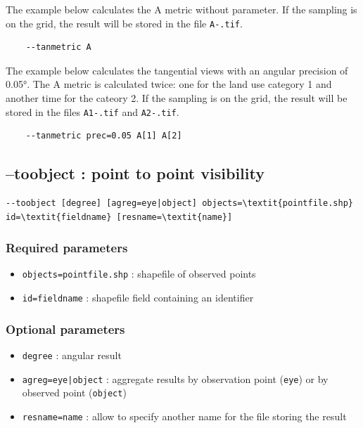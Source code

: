 \documentclass{report}
\begin{document}
The example below calculates the A metric without parameter. If the sampling is on the grid, the result will be stored in the file \verb|A-.tif|.
\begin{Verbatim}
	--tanmetric A
\end{Verbatim}

The example below calculates the tangential views with an angular precision of 0.05°. The A metric is calculated twice: one for the land use category 1 and another time for the cateory 2. If the sampling is on the grid, the result will be stored in the files \verb|A1-.tif| and \verb|A2-.tif|.
\begin{Verbatim}
	--tanmetric prec=0.05 A[1] A[2]
\end{Verbatim}

\subsection{--toobject : point to point visibility}
\begin{Verbatim}[commandchars=\\\{\}]
--toobject [degree] [agreg=eye|object] objects=\textit{pointfile.shp} id=\textit{fieldname} [resname=\textit{name}]
\end{Verbatim}

\subsubsection{Required parameters}
\begin{itemize}
	\item \verb|objects=pointfile.shp| : shapefile of observed points
	\item \verb|id=fieldname| : shapefile field containing an identifier
\end{itemize}

\subsubsection{Optional parameters}
\begin{itemize}
	\item \verb|degree| : angular result
	\item \verb/agreg=eye|object/ : aggregate results by observation point (\verb|eye|) or by observed point (\verb|object|)
	\item \verb|resname=name| : allow to specify another name for the file storing the result
\end{itemize}
\end{document}
